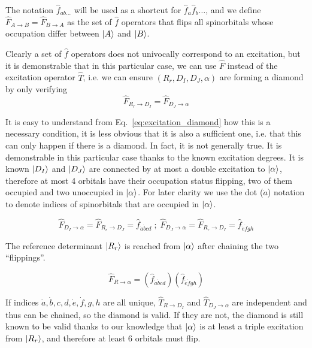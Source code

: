 \documentclass[./thesis.tex]{subfiles}
\begin{document}
The notation $\hat f_{ab\ldots}$ will be used as a shortcut for $\hat f_a \hat f_b \ldots$, and we define $\hat F_{A \rightarrow B} = \hat F_{B \rightarrow A}$ as the set of $\hat f$ operators that flips all spinorbitals whose occupation differ between $\ket A$ and $\ket B$.

Clearly a set of $\hat f$ operators does not univocally correspond to an excitation, but it is demonstrable that in this particular case, we can use $\hat F$ instead of the excitation operator $\hat T$, i.e. we can ensure $(R_r, D_I, D_J, \alpha)$ are forming a diamond by only verifying
\begin{equation}
\hat F_{R_r \rightarrow D_I} = \hat F_{D_J \rightarrow \alpha}
\label{eq:diamond_flip}
\end{equation}

It is easy to understand from Eq.~\eqref{eq:excitation_diamond} how this is a necessary condition, it is less obvious that it is also a sufficient one, i.e. that this can only happen if there is a diamond. In fact, it is not generally true. It is demonstrable in this particular case thanks to the known excitation degrees. It is known $\ket {D_I}$ and $\ket {D_J}$ are connected by at most a double excitation to ${\ket{\alpha}}$, therefore at most 4 orbitals have their occupation status flipping, two of them occupied and two unoccupied in ${\ket{\alpha}}$. For later clarity we use the dot ($\dot a$) notation to denote indices of spinorbitals that are occupied in ${\ket{\alpha}}$.

\begin{equation}
\hat F_{D_I \rightarrow \alpha} = \hat F_{R_r \rightarrow D_J} = \hat f_{\dot a \dot bcd} \; ; \; \hat F_{D_J \rightarrow \alpha} = \hat F_{R_r \rightarrow D_I} = \hat f_{\dot e \dot fgh}
\end{equation}

The reference determinant $\ket {R_r}$ is reached from ${\ket{\alpha}}$ after chaining the two ``flippings''.

\begin{equation}
\hat F_{R \rightarrow \alpha} = (\hat f_{\dot a \dot bcd})(\hat f_{\dot e \dot fgh})
\end{equation}

If indices $\dot a,\dot b,c,d,\dot e,\dot f,g,h$ are all unique, $\hat T_{R \rightarrow D_I}$ and $\hat T_{D_J \rightarrow \alpha}$ are independent and thus can be chained, so the diamond is valid. If they are not, the diamond is still known to be valid thanks to our knowledge that ${\ket{\alpha}}$ is at least a triple excitation from $\ket {R_r}$, and therefore at least 6 orbitals must flip. 
\end{document}
